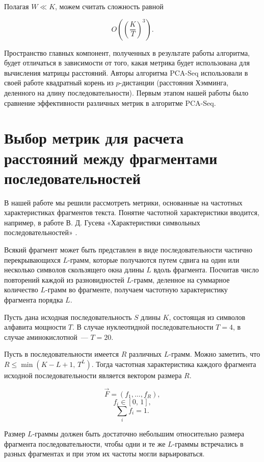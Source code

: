 Полагая $W \ll K$, можем считать сложность равной

\begin{equation}
  O\left(\left(\frac{K}{T}\right)^3\right).
  \label{asimp1}
\end{equation}

Пространство главных компонент, полученных в результате работы алгоритма, будет отличаться в зависимости от того, какая метрика будет использована для вычисления матрицы расстояний. Авторы алгоритма PCA-Seq использовали в своей работе квадратный корень из $p$-дистанции (расстояния Хэмминга, деленного на длину последовательности). Первым этапом нашей работы было сравнение эффективности различных метрик в алгоритме PCA-Seq.

\section{Выбор метрик для расчета расстояний между фрагментами последовательностей}

В нашей работе мы решили рассмотреть метрики, основанные на частотных характеристиках фрагментов текста. Понятие частотной характеристики вводится, например, в работе В. Д. Гусева «Характеристики символьных последовательностей» \cite{gusev}.

Всякий фрагмент может быть представлен в виде последовательности частично перекрывающихся $L$-грамм, которые получаются путем сдвига на один или несколько символов скользящего окна длины $L$ вдоль фрагмента. Посчитав число повторений каждой из разновидностей $L$-грамм, деленное на суммарное количество $L$-грамм во фрагменте, получаем частотную характеристику фрагмента порядка $L$.

Пусть дана исходная последовательность $S$ длины $K$, состоящая из символов алфавита мощности $T$. В случае нуклеотидной последовательности $T=4$, в случае аминокислотной~--- $T = 20$.

Пусть в последовательности имеется $R$ различных $L$-грамм. Можно заметить, что $R\leqslant\min(K-L+1,\, T^L)$. Тогда частотная характеристика каждого фрагмента исходной последовательности является вектором размера $R$.

$$\vec{F} = (f_1,\ldots,f_R),$$
$$f_i \in [0,\,1],$$
$$\sum_i f_i = 1.$$

Размер $L$-граммы должен быть достаточно небольшим относительно размера фрагмента последовательности, чтобы одни и те же $L$-граммы встречались в разных фрагментах и при этом их частоты могли варьироваться.

